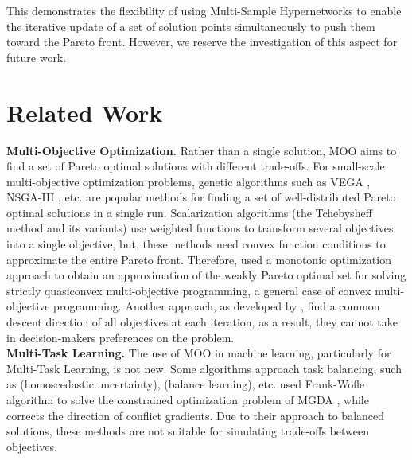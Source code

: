 \documentclass[letterpaper]{article} %
\begin{document}
This demonstrates the flexibility of using Multi-Sample Hypernetworks to enable the iterative update of a set of solution points simultaneously to push them toward the Pareto front. However, we reserve the investigation of this aspect for future work.

\section{Related Work}
\label{st:4}
\indent \textbf{Multi-Objective Optimization.} Rather than a single solution, MOO aims to find a set of Pareto optimal solutions with different trade-offs. For small-scale multi-objective optimization problems, genetic algorithms such as VEGA \cite{inproceedings}, NSGA-III \cite{6600851}, etc. are popular methods for finding a set of well-distributed Pareto optimal solutions in a single run. Scalarization algorithms (the Tchebysheff method \cite{article} and its variants) use weighted functions to transform several objectives into a single objective, but, these methods need convex function conditions to approximate the entire Pareto front. Therefore, \cite{thang2020monotonic} used a monotonic optimization approach to obtain an approximation of the weakly Pareto optimal set for solving strictly quasiconvex multi-objective programming, a general case of convex multi-objective programming. Another approach, as developed by \cite{gradientbased1}, \cite{gradientbased3} find a common descent direction of all objectives at each iteration, as a result, they cannot take in decision-makers preferences on the problem.\\
\indent \textbf{Multi-Task Learning.} The use of MOO in machine learning, particularly for Multi-Task Learning, is not new.  Some algorithms approach task balancing, such as \cite{kendall2018multitask} (homoscedastic uncertainty), \cite{chen2018gradnorm} (balance learning), etc. \cite{sener2019multitask} used Frank-Wofle algorithm to solve the constrained optimization problem of MGDA \cite{gradientbased3}, while \cite{yu2020gradient} corrects the direction of conflict gradients. Due to their approach to balanced solutions, these methods are not suitable for simulating trade-offs between objectives. \\
\end{document}
